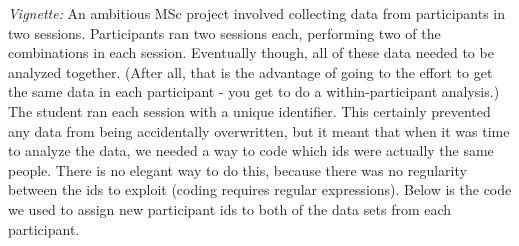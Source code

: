 \documentclass[12pt,]{book}
\theoremstyle{definition}
\theoremstyle{definition}
\theoremstyle{definition}
\theoremstyle{remark}
\begin{document}
\emph{Vignette:} An ambitious MSc project involved collecting data from
participants in two sessions. Participants ran two sessions each,
performing two of the combinations in each session. Eventually though,
all of these data needed to be analyzed together. (After all, that is
the advantage of going to the effort to get the same data in each
participant - you get to do a within-participant analysis.) The student
ran each session with a unique identifier. This certainly prevented any
data from being accidentally overwritten, but it meant that when it was
time to analyze the data, we needed a way to code which ids were
actually the same people. There is no elegant way to do this, because
there was no regularity between the ids to exploit (coding requires
regular expressions). Below is the code we used to assign new
participant ids to both of the data sets from each participant.
\end{document}
